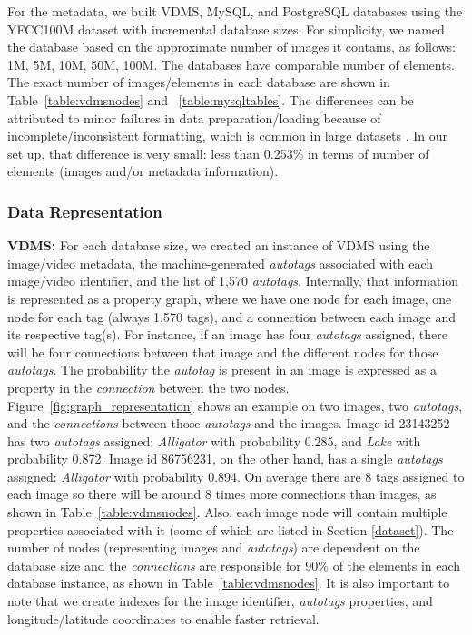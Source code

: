 For the metadata, we built VDMS, MySQL, and PostgreSQL databases
using the YFCC100M dataset with incremental database sizes.
For simplicity, we named the database based on the approximate number of images
it contains, as follows: 1M, 5M, 10M, 50M, 100M.
The databases have comparable number of elements.
The exact number of images/elements in each database are shown in
Table~\ref{table:vdmsnodes} and ~\ref{table:mysqltables}.
The differences can be attributed to minor failures in data
preparation/loading because of incomplete/inconsistent formatting,
which is common in large datasets \cite{failures}.
In our set up, that difference is very small: less than 0.253\% in terms of
number of elements (images and/or metadata information).

\subsubsection{Data Representation}

\textbf{VDMS:}
For each database size, we created an instance of VDMS using the image/video metadata,
the machine-generated \textit{autotags} associated with
each image/video identifier, and the list of 1,570 \textit{autotags}.
Internally, that information is represented as a property graph,
where we have one node for each image, one node for each tag
(always 1,570 tags), and a connection between each image and its respective tag(s).
For instance, if an image has four \textit{autotags} assigned,
there will be four connections between that image and
the different nodes for those \textit{autotags}.
The probability the \textit{autotag} is present in an image
is expressed as a property in the \textit{connection} between the two nodes.
Figure~\ref{fig:graph_representation} shows an example on two images,
two \textit{autotags}, and the \textit{connections} between
those \textit{autotags} and the images.
Image id 23143252 has two \textit{autotags} assigned:
\textit{Alligator} with probability 0.285, and \textit{Lake} with probability 0.872.
Image id 86756231, on the other hand, has a single \textit{autotags} assigned:
\textit{Alligator} with probability 0.894.
On average there are 8 tags assigned to each image so
there will be around 8 times more connections than images, as shown
in Table~\ref{table:vdmsnodes}.
Also, each image node will contain multiple properties associated
with it (some of which are listed in Section \ref{dataset}).
The number of nodes (representing images and \textit{autotags})
are dependent on the database size and the \textit{connections} are responsible for
90\% of the elements in each database instance,
as shown in Table~\ref{table:vdmsnodes}.
It is also important to note that we create indexes for the image identifier,
\textit{autotags} properties, and longitude/latitude coordinates
to enable faster retrieval.

